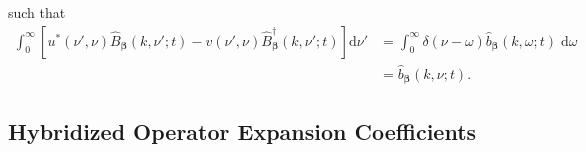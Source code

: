 such that
\begin{equation}
\begin{split}
\int_0^\infty\left[u^*(\nu',\nu)\hat{B}_{\bm{\beta}}(k,\nu';t) - v(\nu',\nu)\hat{B}_{\bm{\beta}}^\dagger(k,\nu';t)\right]\mathrm{d}\nu' &= \int_0^\infty\delta(\nu - \omega)\hat{b}_{\bm{\beta}}(k,\omega;t)\;\mathrm{d}\omega\\
&= \hat{b}_{\bm{\beta}}(k,\nu;t).
\end{split}
\end{equation}








\subsection{Hybridized Operator Expansion Coefficients}

